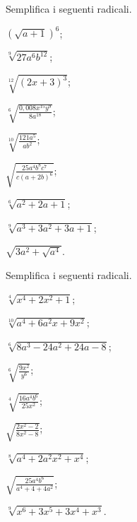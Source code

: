 \begin{esercizio}[\Ast]
 \label{ese:2.28}
Semplifica i seguenti radicali.
 \begin{multicols}{3}
 \begin{enumeratea}
 \item $\left(\sqrt{a+1}\right)^6$;
 \item $\sqrt[9]{27a^6b^{12}}$;
 \item $\sqrt[12]{(2x+3)^3}$;
 \item $\sqrt[6]{\frac{0,008x^{15}y^9}{8a^{18}}}$;
 \item $\sqrt[10]{\frac{121a^5}{ab^2}}$;
 \item $\sqrt{\frac{25a^4b^8c^7}{c(a+2b)^6}}$;
 \item $\sqrt[6]{a^2+2a+1}$;
 \item $\sqrt[9]{a^3+3a^2+3a+1}$;
 \item $\sqrt{3a^2+\sqrt{a^4}}$.
 \end{enumeratea}
 \end{multicols}
\end{esercizio}

\begin{esercizio}[\Ast]
 \label{ese:2.29}
Semplifica i seguenti radicali.
 \begin{multicols}{3}
 \begin{enumeratea}
 \item $\sqrt[4]{x^4+2x^2+1}$;
 \item $\sqrt[10]{a^4+6a^2x+9x^2}$;
 \item $\sqrt[6]{8a^3-24a^2+24a-8}$;
 \item $\sqrt[6]{\frac{9x^2}{y^6}}$;
 \item $\sqrt[4]{\frac{16a^4b^6}{25x^2}}$;
 \item $\sqrt{\frac{2x^2-2}{8x^2-8}}$;
 \item $\sqrt[8]{a^4+2a^2x^2+x^4}$;
 \item $\sqrt{\frac{25a^4b^6}{a^4+4+4a^2}}$;
 \item $\sqrt[9]{x^6+3x^5+3x^4+x^3}$.
 \end{enumeratea}
 \end{multicols}
\end{esercizio}

